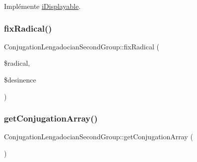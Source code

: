 Implémente \hyperlink{interfacei_displayable_a0264fd455c876e897f754cf85f1681ca}{i\+Displayable}.

\hypertarget{class_conjugation_lengadocian_second_group_a236aaf5140e4cb5738a2af876eded810}{}\label{class_conjugation_lengadocian_second_group_a236aaf5140e4cb5738a2af876eded810} 
\subsubsection{\texorpdfstring{fix\+Radical()}{fixRadical()}}
{\footnotesize\ttfamily Conjugation\+Lengadocian\+Second\+Group\+::fix\+Radical (\begin{DoxyParamCaption}\item[{}]{\$radical,  }\item[{}]{\$desinence }\end{DoxyParamCaption})\hspace{0.3cm}{\ttfamily [protected]}}

\hypertarget{class_conjugation_lengadocian_second_group_a06cea5291eea31ff2aa699f5c27cbf5f}{}\label{class_conjugation_lengadocian_second_group_a06cea5291eea31ff2aa699f5c27cbf5f} 
\subsubsection{\texorpdfstring{get\+Conjugation\+Array()}{getConjugationArray()}}
{\footnotesize\ttfamily Conjugation\+Lengadocian\+Second\+Group\+::get\+Conjugation\+Array (\begin{DoxyParamCaption}{ }\end{DoxyParamCaption})\hspace{0.3cm}{\ttfamily [protected]}}

\hypertarget{class_conjugation_lengadocian_second_group_a8230cbb2d79d7ce6d85b866082925b12}{}\label{class_conjugation_lengadocian_second_group_a8230cbb2d79d7ce6d85b866082925b12} 
